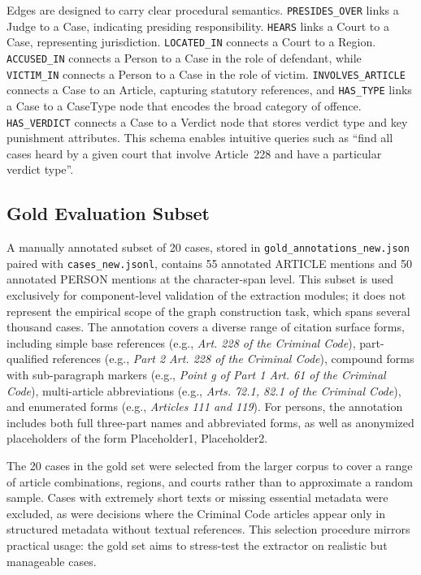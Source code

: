 \documentclass[11pt]{article}
\begin{document}
Edges are designed to carry clear procedural semantics. \texttt{PRESIDES\_OVER} links a Judge to a Case, indicating presiding responsibility. \texttt{HEARS} links a Court to a Case, representing jurisdiction. \texttt{LOCATED\_IN} connects a Court to a Region. \texttt{ACCUSED\_IN} connects a Person to a Case in the role of defendant, while \texttt{VICTIM\_IN} connects a Person to a Case in the role of victim. \texttt{INVOLVES\_ARTICLE} connects a Case to an Article, capturing statutory references, and \texttt{HAS\_TYPE} links a Case to a CaseType node that encodes the broad category of offence. \texttt{HAS\_VERDICT} connects a Case to a Verdict node that stores verdict type and key punishment attributes. This schema enables intuitive queries such as ``find all cases heard by a given court that involve Article~228 and have a particular verdict type''.

\subsection{Gold Evaluation Subset}

A manually annotated subset of 20 cases, stored in \texttt{gold\_annotations\_new.json} paired with \texttt{cases\_new.jsonl}, contains 55 annotated ARTICLE mentions and 50 annotated PERSON mentions at the character-span level. This subset is used exclusively for component-level validation of the extraction modules; it does not represent the empirical scope of the graph construction task, which spans several thousand cases. The annotation covers a diverse range of citation surface forms, including simple base references (e.g., \textit{Art. 228 of the Criminal Code}), part-qualified references (e.g., \textit{Part 2 Art. 228 of the Criminal Code}), compound forms with sub-paragraph markers (e.g., \textit{Point g of Part 1 Art. 61 of the Criminal Code}), multi-article abbreviations (e.g., \textit{Arts. 72.1, 82.1 of the Criminal Code}), and enumerated forms (e.g., \textit{Articles 111 and 119}). For persons, the annotation includes both full three-part names and abbreviated forms, as well as anonymized placeholders of the form Placeholder1, Placeholder2.

The 20 cases in the gold set were selected from the larger corpus to cover a range of article combinations, regions, and courts rather than to approximate a random sample. Cases with extremely short texts or missing essential metadata were excluded, as were decisions where the Criminal Code articles appear only in structured metadata without textual references. This selection procedure mirrors practical usage: the gold set aims to stress-test the extractor on realistic but manageable cases.
\end{document}

